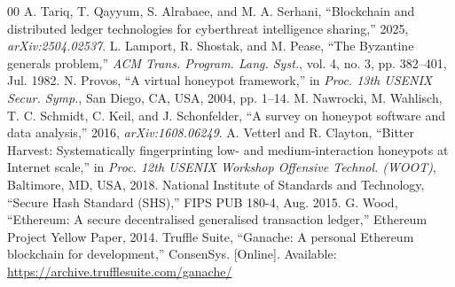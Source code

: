 \documentclass[conference]{IEEEtran}
\begin{document}
{\begin{thebibliography}{00}
 A. Tariq, T. Qayyum, S. Alrabaee, and M. A. Serhani, ``Blockchain and distributed ledger technologies for cyberthreat intelligence sharing,'' 2025, \emph{arXiv:2504.02537}.
 L. Lamport, R. Shostak, and M. Pease, ``The Byzantine generals problem,'' \emph{ACM Trans. Program. Lang. Syst.}, vol. 4, no. 3, pp. 382--401, Jul. 1982.
 N. Provos, ``A virtual honeypot framework,'' in \emph{Proc. 13th USENIX Secur. Symp.}, San Diego, CA, USA, 2004, pp. 1--14.
 M. Nawrocki, M. Wahlisch, T. C. Schmidt, C. Keil, and J. Schonfelder, ``A survey on honeypot software and data analysis,'' 2016, \emph{arXiv:1608.06249}.
 A. Vetterl and R. Clayton, ``Bitter Harvest: Systematically fingerprinting low- and medium-interaction honeypots at Internet scale,'' in \emph{Proc. 12th USENIX Workshop Offensive Technol. (WOOT)}, Baltimore, MD, USA, 2018.
 National Institute of Standards and Technology, ``Secure Hash Standard (SHS),'' FIPS PUB 180-4, Aug. 2015.
 G. Wood, ``Ethereum: A secure decentralised generalised transaction ledger,'' Ethereum Project Yellow Paper, 2014.
 Truffle Suite, ``Ganache: A personal Ethereum blockchain for development,'' ConsenSys. [Online]. Available: \url{https://archive.trufflesuite.com/ganache/}
\end{thebibliography}}
\end{document}
